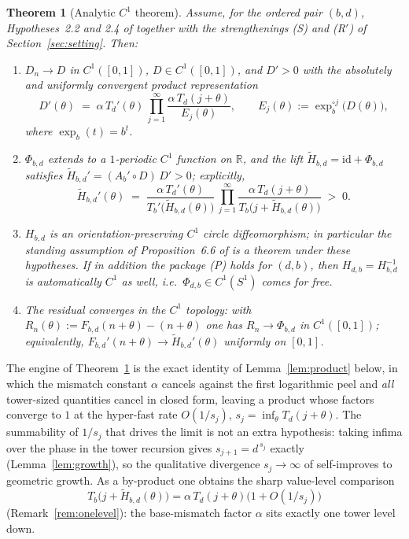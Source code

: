 \documentclass[11pt]{article}
\newtheorem{theoremA}{Theorem}
\theoremstyle{definition}
\theoremstyle{remark}
\newcommand{\R}{\mathbb{R}}
\newcommand{\Sone}{S^{1}}
\newcommand{\Tb}{T_{b}}
\newcommand{\Td}{T_{d}}
\newcommand{\expb}{\exp_{b}}
\newcommand{\Ht}{\widetilde H}
\begin{document}
\begin{theoremA}[Analytic $C^{1}$ theorem]\label{thm:D}
Assume, for the ordered pair $(b,d)$, Hypotheses~2.2 and 2.4 of \cite{J}
together with the strengthenings \textup{(S)} and \textup{(R$'$)} of
Section~\ref{sec:setting}. Then:
\begin{enumerate}
\item[\textup{(i)}] $D_n\to D$ in $C^{1}([0,1])$, $D\in C^{1}([0,1])$,
and $D'>0$ with the absolutely and uniformly convergent product
representation
\begin{equation}\label{eq:Dprime}
D'(\theta)\;=\;\alpha\,\Td'(\theta)\,
\prod_{j=1}^{\infty}\frac{\alpha\,\Td(j+\theta)}{E_j(\theta)},
\qquad
E_j(\theta):=\expb^{\circ j}\big(D(\theta)\big),
\end{equation}
where $\expb(t)=b^{t}$.
\item[\textup{(ii)}] $\Phi_{b,d}$ extends to a $1$-periodic $C^{1}$
function on $\R$, and the lift $\Ht_{b,d}=\mathrm{id}+\Phi_{b,d}$
satisfies $\Ht_{b,d}'=(A_b'\circ D)\,D'>0$; explicitly,
\begin{equation}\label{eq:Hprime}
\Ht_{b,d}'(\theta)\;=\;\frac{\alpha\,\Td'(\theta)}{\Tb'\big(\Ht_{b,d}(\theta)\big)}\,
\prod_{j=1}^{\infty}
\frac{\alpha\,\Td(j+\theta)}{\Tb\big(j+\Ht_{b,d}(\theta)\big)}\;>\;0 .
\end{equation}
\item[\textup{(iii)}] $H_{b,d}$ is an orientation-preserving $C^{1}$
circle diffeomorphism; in particular the standing assumption of
Proposition~6.6 of \cite{J} is a theorem under these hypotheses. If in
addition the package \textup{(P)} holds for $(d,b)$, then
$H_{d,b}=H_{b,d}^{-1}$ is automatically $C^{1}$ as well, i.e.\
$\Phi_{d,b}\in C^{1}(\Sone)$ comes for free.
\item[\textup{(iv)}] The residual converges in the $C^{1}$ topology:
with $R_n(\theta):=F_{b,d}(n+\theta)-(n+\theta)$ one has $R_n\to\Phi_{b,d}$
in $C^{1}([0,1])$; equivalently, $F_{b,d}'(n+\theta)\to
\Ht_{b,d}'(\theta)$ uniformly on $[0,1]$.
\end{enumerate}
\end{theoremA}

The engine of Theorem~\ref{thm:D} is the exact identity of
Lemma~\ref{lem:product} below, in which the mismatch constant $\alpha$
cancels against the first logarithmic peel and \emph{all} tower-sized
quantities cancel in closed form, leaving a product whose factors converge
to $1$ at the hyper-fast rate $O(1/s_j)$, $s_j=\inf_\theta\Td(j+\theta)$.
The summability of $1/s_j$ that drives the limit is not an extra
hypothesis: taking infima over the phase in the tower recursion gives
$s_{j+1}=d^{\,s_j}$ exactly (Lemma~\ref{lem:growth}), so the qualitative
divergence $s_j\to\infty$ of \cite[Hyp.~2.4]{J} self-improves to geometric
growth. As a by-product one obtains the sharp value-level comparison
\[
\Tb\big(j+\Ht_{b,d}(\theta)\big)=\alpha\,\Td(j+\theta)\big(1+O(1/s_j)\big)
\]
(Remark~\ref{rem:onelevel}): the base-mismatch factor $\alpha$ sits
exactly one tower level down.
\end{document}
